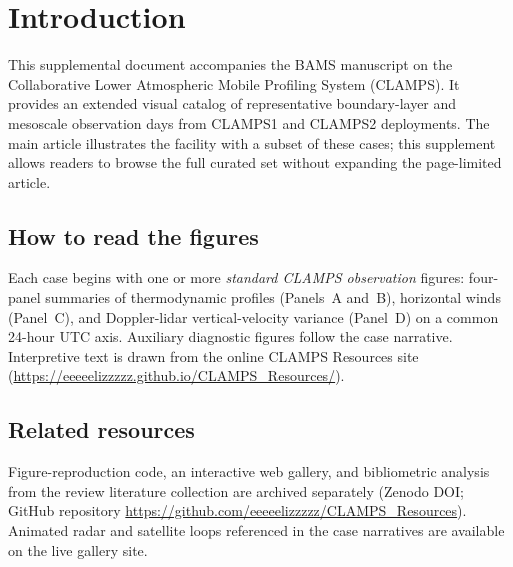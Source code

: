 \section*{Introduction}

This supplemental document accompanies the BAMS manuscript on the Collaborative
Lower Atmospheric Mobile Profiling System (CLAMPS). It provides an extended
visual catalog of representative boundary-layer and mesoscale observation days
from CLAMPS1 and CLAMPS2 deployments. The main article illustrates the facility
with a subset of these cases; this supplement allows readers to browse the full
curated set without expanding the page-limited article.

\subsection*{How to read the figures}

Each case begins with one or more \emph{standard CLAMPS observation} figures:
four-panel summaries of thermodynamic profiles (Panels~A and~B), horizontal
winds (Panel~C), and Doppler-lidar vertical-velocity variance (Panel~D) on a
common 24-hour UTC axis. Auxiliary diagnostic figures follow the case narrative.
Interpretive text is drawn from the online CLAMPS Resources site
(\url{https://eeeeelizzzzz.github.io/CLAMPS_Resources/}).

\subsection*{Related resources}

Figure-reproduction code, an interactive web gallery, and bibliometric analysis
from the review literature collection are archived separately (Zenodo DOI; GitHub repository
\url{https://github.com/eeeeelizzzzz/CLAMPS_Resources}). Animated radar and
satellite loops referenced in the case narratives are available on the live
gallery site.
